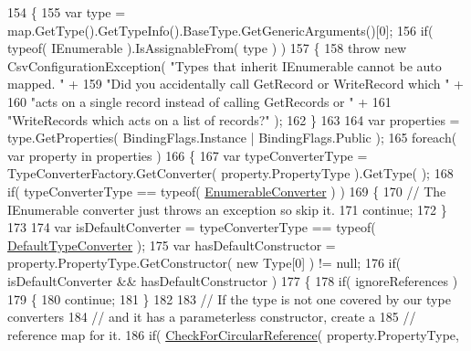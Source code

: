 \begin{DoxyCode}
154         \{
155             var type = map.GetType().GetTypeInfo().BaseType.GetGenericArguments()[0];
156             \textcolor{keywordflow}{if}( typeof( IEnumerable ).IsAssignableFrom( type ) )
157             \{
158                 \textcolor{keywordflow}{throw} \textcolor{keyword}{new} CsvConfigurationException( \textcolor{stringliteral}{"Types that inherit IEnumerable cannot be auto mapped.
       "} +
159                                                      \textcolor{stringliteral}{"Did you accidentally call GetRecord or WriteRecord
       which "} +
160                                                      \textcolor{stringliteral}{"acts on a single record instead of calling GetRecords
       or "} +
161                                                      \textcolor{stringliteral}{"WriteRecords which acts on a list of records?"} );
162             \}
163 
164             var properties = type.GetProperties( BindingFlags.Instance | BindingFlags.Public );
165             \textcolor{keywordflow}{foreach}( var property \textcolor{keywordflow}{in} properties )
166             \{
167                 var typeConverterType = TypeConverterFactory.GetConverter( property.PropertyType ).GetType(
      );
168                 \textcolor{keywordflow}{if}( typeConverterType == typeof( \hyperlink{a00078}{EnumerableConverter} ) )
169                 \{
170                     \textcolor{comment}{// The IEnumerable converter just throws an exception so skip it.}
171                     \textcolor{keywordflow}{continue};
172                 \}
173 
174                 var isDefaultConverter = typeConverterType == typeof( 
      \hyperlink{a00068}{DefaultTypeConverter} );
175                 var hasDefaultConstructor = property.PropertyType.GetConstructor( \textcolor{keyword}{new} Type[0] ) != null;
176                 \textcolor{keywordflow}{if}( isDefaultConverter && hasDefaultConstructor )
177                 \{
178                     \textcolor{keywordflow}{if}( ignoreReferences )
179                     \{
180                         \textcolor{keywordflow}{continue};
181                     \}
182 
183                     \textcolor{comment}{// If the type is not one covered by our type converters}
184                     \textcolor{comment}{// and it has a parameterless constructor, create a}
185                     \textcolor{comment}{// reference map for it.}
186                     \textcolor{keywordflow}{if}( \hyperlink{a00040_a4b2f3fc2e0670d17566b4705b7b622aa}{CheckForCircularReference}( property.PropertyType, 

\end{DoxyCode}
